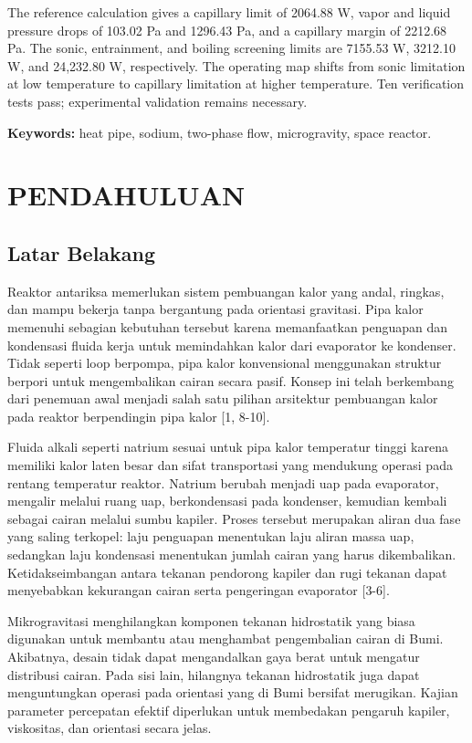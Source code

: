 \documentclass[
  12pt,a4paper,oneside]{report}
\providecommand{\mainmatter}{\clearpage\pagenumbering{arabic}}
\begin{document}
The reference calculation gives a capillary limit of 2064.88 W, vapor
and liquid pressure drops of 103.02 Pa and 1296.43 Pa, and a capillary
margin of 2212.68 Pa. The sonic, entrainment, and boiling screening
limits are 7155.53 W, 3212.10 W, and 24,232.80 W, respectively. The
operating map shifts from sonic limitation at low temperature to
capillary limitation at higher temperature. Ten verification tests pass;
experimental validation remains necessary.

\textbf{Keywords:} heat pipe, sodium, two-phase flow, microgravity,
space reactor.

\mainmatter

\hypertarget{pendahuluan}{%
\chapter{PENDAHULUAN}\label{pendahuluan}}

\hypertarget{latar-belakang}{%
\section{Latar Belakang}\label{latar-belakang}}

Reaktor antariksa memerlukan sistem pembuangan kalor yang andal,
ringkas, dan mampu bekerja tanpa bergantung pada orientasi gravitasi.
Pipa kalor memenuhi sebagian kebutuhan tersebut karena memanfaatkan
penguapan dan kondensasi fluida kerja untuk memindahkan kalor dari
evaporator ke kondenser. Tidak seperti loop berpompa, pipa kalor
konvensional menggunakan struktur berpori untuk mengembalikan cairan
secara pasif. Konsep ini telah berkembang dari penemuan awal menjadi
salah satu pilihan arsitektur pembuangan kalor pada reaktor berpendingin
pipa kalor {[}1, 8-10{]}.

Fluida alkali seperti natrium sesuai untuk pipa kalor temperatur tinggi
karena memiliki kalor laten besar dan sifat transportasi yang mendukung
operasi pada rentang temperatur reaktor. Natrium berubah menjadi uap
pada evaporator, mengalir melalui ruang uap, berkondensasi pada
kondenser, kemudian kembali sebagai cairan melalui sumbu kapiler. Proses
tersebut merupakan aliran dua fase yang saling terkopel: laju penguapan
menentukan laju aliran massa uap, sedangkan laju kondensasi menentukan
jumlah cairan yang harus dikembalikan. Ketidakseimbangan antara tekanan
pendorong kapiler dan rugi tekanan dapat menyebabkan kekurangan cairan
serta pengeringan evaporator {[}3-6{]}.

Mikrogravitasi menghilangkan komponen tekanan hidrostatik yang biasa
digunakan untuk membantu atau menghambat pengembalian cairan di Bumi.
Akibatnya, desain tidak dapat mengandalkan gaya berat untuk mengatur
distribusi cairan. Pada sisi lain, hilangnya tekanan hidrostatik juga
dapat menguntungkan operasi pada orientasi yang di Bumi bersifat
merugikan. Kajian parameter percepatan efektif diperlukan untuk
membedakan pengaruh kapiler, viskositas, dan orientasi secara jelas.
\end{document}
